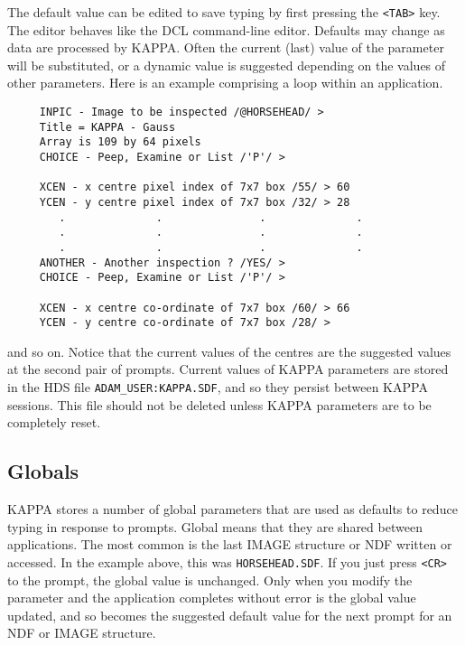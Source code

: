 The default value can be edited to save typing by first pressing the
{\tt <TAB>} key. The editor behaves like the {\small DCL} command-line
editor. Defaults may change as data are processed by {\small KAPPA}.
Often the current (last) value of the parameter will be substituted, or
a dynamic value is suggested depending on the values of other
parameters. Here is an example comprising a loop within an application.

\small
\begin{verbatim}
     INPIC - Image to be inspected /@HORSEHEAD/ >
     Title = KAPPA - Gauss
     Array is 109 by 64 pixels
     CHOICE - Peep, Examine or List /'P'/ >

     XCEN - x centre pixel index of 7x7 box /55/ > 60
     YCEN - y centre pixel index of 7x7 box /32/ > 28
        .              .               .              .
        .              .               .              .
        .              .               .              .
     ANOTHER - Another inspection ? /YES/ >
     CHOICE - Peep, Examine or List /'P'/ >

     XCEN - x centre co-ordinate of 7x7 box /60/ > 66
     YCEN - y centre co-ordinate of 7x7 box /28/ >
\end{verbatim}
\normalsize
and so on. 
Notice that the current values of the centres are the suggested values
at the second pair of prompts.
Current values of KAPPA parameters are stored in the HDS file
{\tt ADAM\_USER:KAPPA.SDF}, and so they persist between {\small KAPPA} sessions.
This file should not be deleted unless {\small KAPPA} parameters are to
be completely reset.

\subsection{Globals}
{\small KAPPA} stores a number of global parameters that are used as
defaults to reduce typing in response to prompts. Global means that they are
shared between applications.  The most common is the last IMAGE structure
or NDF written or accessed.  In the example above, this was
{\tt HORSEHEAD.SDF}.  If you just press {\tt <CR>} to the prompt, the global
value is unchanged. Only when you modify the parameter and the
application completes without error is the
global value updated, and so becomes the suggested default value for the
next prompt for an NDF or IMAGE structure. 


